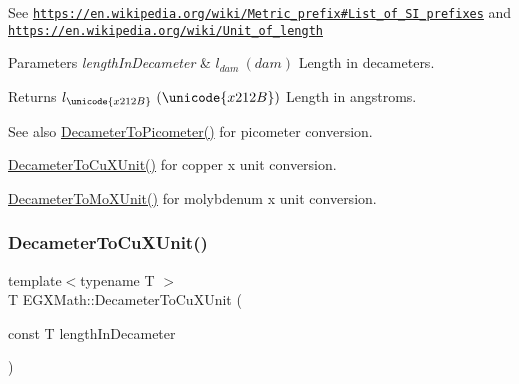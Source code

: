See \href{https://en.wikipedia.org/wiki/Metric_prefix#List_of_SI_prefixes}{\tt https\+://en.\+wikipedia.\+org/wiki/\+Metric\+\_\+prefix\#\+List\+\_\+of\+\_\+\+S\+I\+\_\+prefixes} and \href{https://en.wikipedia.org/wiki/Unit_of_length}{\tt https\+://en.\+wikipedia.\+org/wiki/\+Unit\+\_\+of\+\_\+length} 
\begin{DoxyParams}{Parameters}
{\em length\+In\+Decameter} & $ l_{dam}\ (dam)$ Length in decameters. \\
\hline
\end{DoxyParams}
\begin{DoxyReturn}{Returns}
$ l_{\unicode{x212B}}\ (\unicode{x212B})$ Length in angstroms. 
\end{DoxyReturn}
\begin{DoxySeeAlso}{See also}
\mbox{\hyperlink{group___e_g_x_math-_conversions-_length_conversions-_decameter-_s_i_gab265bbced03f7b08cf4ad0db29da6dfd}{Decameter\+To\+Picometer()}} for picometer conversion. 

\mbox{\hyperlink{group___e_g_x_math-_conversions-_length_conversions-_decameter-_non-_s_i_gaf256500ca4f0b7a62018ea61078c29e3}{Decameter\+To\+Cu\+X\+Unit()}} for copper x unit conversion. 

\mbox{\hyperlink{group___e_g_x_math-_conversions-_length_conversions-_decameter-_non-_s_i_ga9e345feeb2568ded9fdceaf1d23d0ca6}{Decameter\+To\+Mo\+X\+Unit()}} for molybdenum x unit conversion. 
\end{DoxySeeAlso}
\mbox{\label{group___e_g_x_math-_conversions-_length_conversions-_decameter-_non-_s_i_gaf256500ca4f0b7a62018ea61078c29e3}} 
\subsubsection{\texorpdfstring{Decameter\+To\+Cu\+X\+Unit()}{DecameterToCuXUnit()}}
{\footnotesize\ttfamily template$<$typename T $>$ \\
T E\+G\+X\+Math\+::\+Decameter\+To\+Cu\+X\+Unit (\begin{DoxyParamCaption}\item[{const T}]{length\+In\+Decameter }\end{DoxyParamCaption})}



